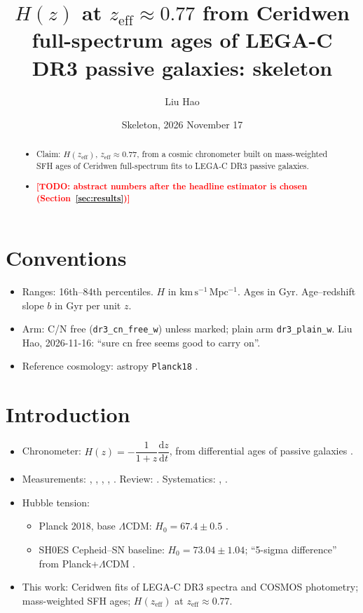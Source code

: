\documentclass[fleqn,usenatbib]{mnras}
\title[Chronometer $H(z)$ from Ceridwen fits of LEGA-C DR3]{$H(z)$ at $z_\mathrm{eff}\approx0.77$ from Ceridwen full-spectrum ages of LEGA-C DR3 passive galaxies: skeleton}
\author[Liu Hao]{Liu Hao}
\date{Skeleton, 2026 November 17}
\newcommand{\todo}[1]{\textcolor{red}{\textbf{[TODO: #1]}}}
\newcommand{\Hu}{\ensuremath{\mathrm{km\,s^{-1}\,Mpc^{-1}}}}
\newcommand{\zeff}{\ensuremath{z_\mathrm{eff}}}
\begin{document}
\label{firstpage}
\pagerange{\pageref{firstpage}--\pageref{lastpage}}
\maketitle

\begin{abstract}
\begin{itemize}
\item Claim: $H(\zeff)$, $\zeff\approx0.77$, from a cosmic chronometer built on mass-weighted SFH ages of Ceridwen full-spectrum fits to LEGA-C DR3 passive galaxies.
\item \todo{abstract numbers after the headline estimator is chosen (Section~\ref{sec:results})}
\end{itemize}
\end{abstract}

\section*{Conventions}
\begin{itemize}
\item Ranges: 16th--84th percentiles. $H$ in \Hu. Ages in Gyr. Age--redshift slope $b$ in Gyr per unit $z$.
\item Arm: C/N free (\texttt{dr3\_cn\_free\_w}) unless marked; plain arm \texttt{dr3\_plain\_w}. Liu Hao, 2026-11-16: ``sure cn free seems good to carry on''. 
\item Reference cosmology: astropy \texttt{Planck18} \citep{Planck2020}. 
\end{itemize}

\section{Introduction}
\begin{itemize}
\item Chronometer: $H(z) = -\dfrac{1}{1+z}\dfrac{\mathrm{d}z}{\mathrm{d}t}$, from differential ages of passive galaxies \citep[eq.~2]{JimenezLoeb2002}.
\item Measurements: \citet{Simon2005}, \citet{Stern2010}, \citet{Moresco2012}, \citet{Moresco2015}, \citet{Moresco2016}. Review: \citet{Moresco2022}. Systematics: \citet{Moresco2018}, \citet{Moresco2020}.
\item Hubble tension:
  \begin{itemize}
  \item Planck 2018, base $\Lambda$CDM: $H_0 = 67.4\pm0.5$ \citep{Planck2020}.
  \item SH0ES Cepheid--SN baseline: $H_0 = 73.04\pm1.04$; ``5-sigma difference'' from Planck+$\Lambda$CDM \citep{Riess2022}.
  \end{itemize}
\item This work: Ceridwen \citep{Stoffers2026} fits of LEGA-C DR3 \citep{vanderWel2021} spectra and COSMOS photometry; mass-weighted SFH ages; $H(\zeff)$ at $\zeff\approx0.77$.
\end{itemize}
\end{document}
